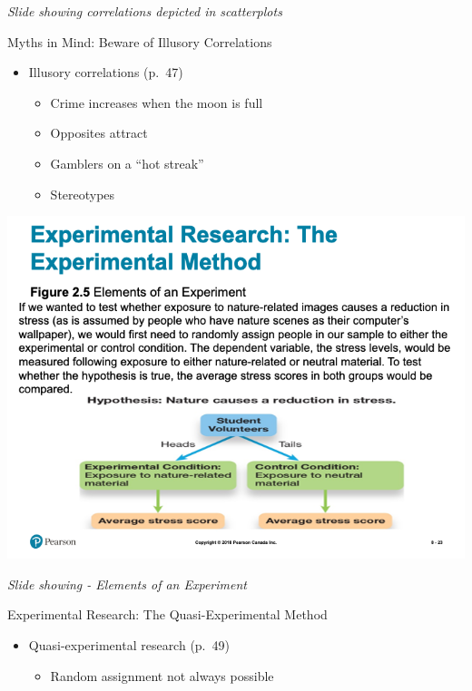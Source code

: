 \documentclass[
]{book}
\providecommand{\tightlist}{%
  \setlength{\itemsep}{0pt}\setlength{\parskip}{0pt}}
\begin{document}
\begin{reflect}
\emph{Slide showing correlations depicted in scatterplots}

Myths in Mind: Beware of Illusory Correlations

\begin{itemize}
\tightlist
\item
  Illusory correlations (p.~47)

  \begin{itemize}
  \tightlist
  \item
    Crime increases when the moon is full\\
  \item
    Opposites attract\\
  \item
    Gamblers on a ``hot streak''\\
  \item
    Stereotypes
  \end{itemize}
\end{itemize}

\includegraphics{assets/unit_1/slide_23.png}

\emph{Slide showing - Elements of an Experiment}

Experimental Research: The Quasi-Experimental Method

\begin{itemize}
\tightlist
\item
  Quasi-experimental research (p.~49)

  \begin{itemize}
  \tightlist
  \item
    Random assignment not always possible


\end{itemize}
\end{itemize}
\end{reflect}
\end{document}
